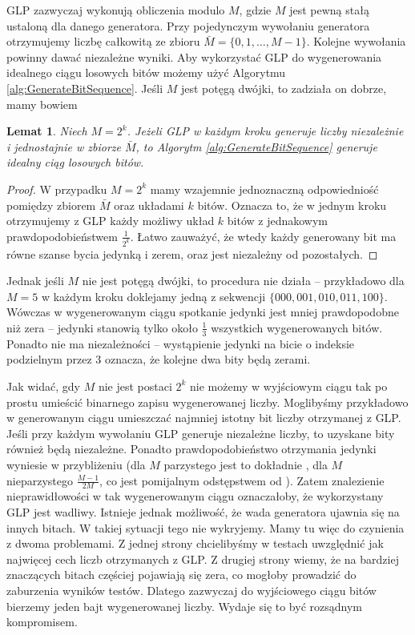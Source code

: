 \documentclass[a4paper,11pt,oneside]{book}
\newtheorem{lemat}[twier]{Lemat}
\theoremstyle{definition}
\begin{document}
GLP zazwyczaj wykonują obliczenia modulo $M$, gdzie $M$ jest pewną stałą ustaloną dla danego generatora. Przy pojedynczym wywołaniu generatora otrzymujemy liczbę całkowitą ze zbioru $\bar{M} = \{0, 1, \ldots, M-1 \}$. Kolejne wywołania powinny dawać niezależne wyniki. Aby wykorzystać GLP do wygenerowania idealnego ciągu losowych bitów możemy użyć Algorytmu \ref{alg:GenerateBitSequence}. Jeśli $M$ jest potęgą dwójki, to zadziała on dobrze, mamy bowiem
\begin{lemat}
 Niech $M = 2^k$. Jeżeli GLP w każdym kroku generuje liczby niezależnie i jednostajnie w zbiorze $\bar{M}$, to Algorytm \ref{alg:GenerateBitSequence} generuje idealny ciąg losowych bitów.
\end{lemat}
\begin{proof}
 W przypadku $M = 2^k$ mamy wzajemnie jednoznaczną odpowiedniość pomiędzy zbiorem $\bar{M}$ oraz układami $k$ bitów. Oznacza to, że w jednym kroku otrzymujemy z GLP każdy możliwy układ $k$ bitów z jednakowym prawdopodobieństwem $\frac{1}{2^k}$. Łatwo zauważyć, że wtedy każdy generowany bit ma równe szanse bycia jedynką i zerem, oraz jest niezależny od pozostałych.
\end{proof}

Jednak jeśli $M$ nie jest potęgą dwójki, to procedura nie działa -- przykładowo dla $M=5$ w każdym kroku doklejamy jedną z sekwencji $\{000, 001, 010, 011, 100\}$. Wówczas w wygenerowanym ciągu spotkanie jedynki jest mniej prawdopodobne niż zera -- jedynki stanowią tylko około $\frac{1}{3}$ wszystkich wygenerowanych bitów. Ponadto nie ma niezależności -- wystąpienie jedynki na bicie o indeksie podzielnym przez 3 oznacza, że kolejne dwa bity będą zerami.

Jak widać, gdy $M$ nie jest postaci $2^k$ nie możemy w wyjściowym ciągu tak po prostu umieścić binarnego zapisu wygenerowanej liczby. Moglibyśmy przykładowo w generowanym ciągu umieszczać najmniej istotny bit liczby otrzymanej z GLP. Jeśli przy każdym wywołaniu GLP generuje niezależne liczby, to uzyskane bity również będą niezależne. Ponadto prawdopodobieństwo otrzymania jedynki wyniesie w przybliżeniu \textonehalf (dla $M$ parzystego jest to dokładnie \textonehalf, dla $M$ nieparzystego $\frac{M-1}{2M}$, co jest pomijalnym odstępstwem od \textonehalf). Zatem znalezienie nieprawidłowości w tak wygenerowanym ciągu oznaczałoby, że wykorzystany GLP jest wadliwy. Istnieje jednak możliwość, że wada generatora ujawnia się na innych bitach. W takiej sytuacji tego nie wykryjemy. Mamy tu więc do czynienia z dwoma problemami. Z jednej strony chcielibyśmy w testach uwzględnić jak najwięcej cech liczb otrzymanych z GLP. Z drugiej strony wiemy, że na bardziej znaczących bitach częściej pojawiają się zera, co mogłoby prowadzić do zaburzenia wyników testów. Dlatego zazwyczaj do wyjściowego ciągu bitów bierzemy jeden bajt wygenerowanej liczby. Wydaje się to być rozsądnym kompromisem.
\end{document}
